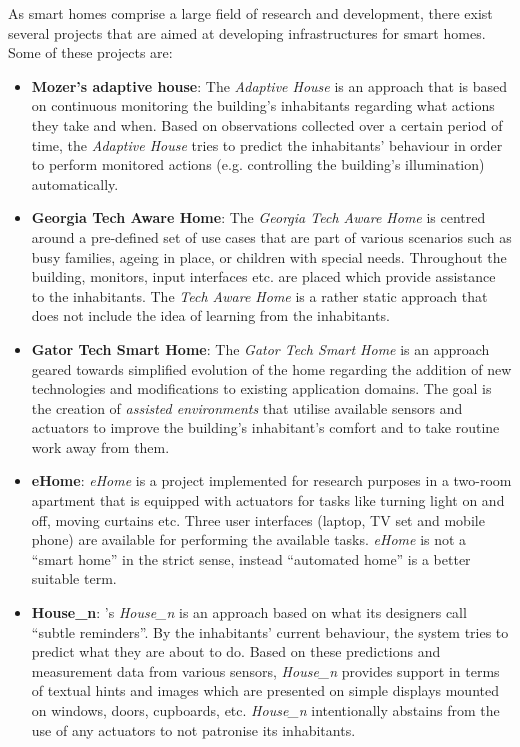 As smart homes comprise a large field of research and development, there exist several projects that are aimed at developing infrastructures for smart homes. Some of these projects are:
\begin{itemize}
  \item \textbf{Mozer's adaptive house}: The \emph{Adaptive House} is an approach that is based on continuous monitoring the building's inhabitants regarding what actions they take and when. Based on observations collected over a certain period of time, the \emph{Adaptive House} tries to predict the inhabitants' behaviour in order to perform monitored actions (e.g. controlling the building's illumination) automatically.~\cite{adaptivehouse}
  \item \textbf{Georgia Tech Aware Home}: The \emph{Georgia Tech Aware Home} is centred around a pre-defined set of use cases that are part of various scenarios such as busy families, ageing in place, or children with special needs. Throughout the building, monitors, input interfaces etc. are placed which provide assistance to the inhabitants. The \emph{Tech Aware Home} is a rather static approach that does not include the idea of learning from the inhabitants.~\cite{techawarehome}
  \item \textbf{Gator Tech Smart Home}: The \emph{Gator Tech Smart Home} is an approach geared towards simplified evolution of the home regarding the addition of new technologies and modifications to existing application domains. The goal is the creation of \emph{assisted environments} that utilise available sensors and actuators to improve the building's inhabitant's comfort and to take routine work away from them.~\cite{gator_tech}
  \item \textbf{eHome}: \emph{eHome} is a project implemented for research purposes in a two-room apartment that is equipped with actuators for tasks like turning light on and off, moving curtains etc. Three user interfaces (laptop, TV set and mobile phone) are available for performing the available tasks. \emph{eHome} is not a ``smart home'' in the strict sense, instead ``automated home'' is a better suitable term.~\cite{ehome}
  \item \textbf{House\_n}: 's \emph{House\_n} is an approach based on what its designers call ``subtle reminders''. By the inhabitants' current behaviour, the system tries to predict what they are about to do. Based on these predictions and measurement data from various sensors, \emph{House\_n} provides support in terms of textual hints and images which are presented on simple displays mounted on windows, doors, cupboards, etc. \emph{House\_n} intentionally abstains from the use of any actuators to not patronise its inhabitants.~\cite{housen}
\end{itemize}

